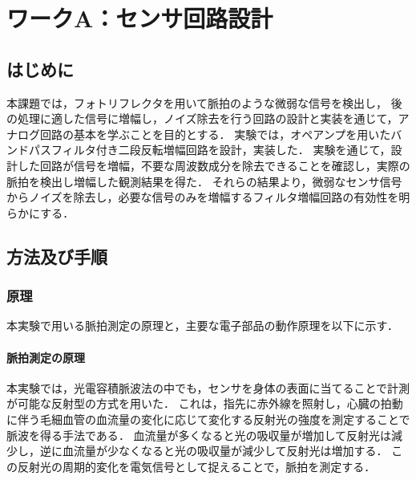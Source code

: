 \chapter{ワークA：センサ回路設計}

\section{はじめに}

本課題では，フォトリフレクタを用いて脈拍のような微弱な信号を検出し，
後の処理に適した信号に増幅し，ノイズ除去を行う回路の設計と実装を通じて，アナログ回路の基本を学ぶことを目的とする．
実験では，オペアンプを用いたバンドパスフィルタ付き二段反転増幅回路を設計，実装した．
実験を通じて，設計した回路が信号を増幅，不要な周波数成分を除去できることを確認し，実際の脈拍を検出し増幅した観測結果を得た．
それらの結果より，微弱なセンサ信号からノイズを除去し，必要な信号のみを増幅するフィルタ増幅回路の有効性を明らかにする．




\section{方法及び手順} 



\subsection{原理}
本実験で用いる脈拍測定の原理と，主要な電子部品の動作原理を以下に示す．


\subsubsection{脈拍測定の原理}
本実験では，光電容積脈波法の中でも，センサを身体の表面に当てることで計測が可能な反射型の方式を用いた．
これは，指先に赤外線を照射し，心臓の拍動に伴う毛細血管の血流量の変化に応じて変化する反射光の強度を測定することで脈波を得る手法である\cite{安藤譲二1990光電式脈波計測の応用}．
血流量が多くなると光の吸収量が増加して反射光は減少し，逆に血流量が少なくなると光の吸収量が減少して反射光は増加する\cite{hertzman1938blood}．
この反射光の周期的変化を電気信号として捉えることで，脈拍を測定する．


